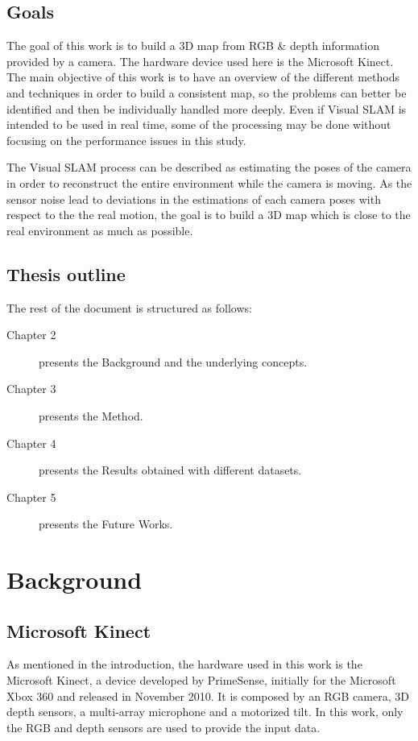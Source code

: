 \documentclass[a4paper,11pt]{kth-mag}
\begin{document}
\section{Goals}

The goal of this work is to build a 3D map from RGB \& depth information provided by a camera. The hardware device used here is the Microsoft Kinect. The main objective of this work is to have an overview of the different methods and techniques in order to build a consistent map, so the problems can better be identified and then be individually handled more deeply. Even if Visual SLAM is intended to be used in real time, some of the processing may be done without focusing on the performance issues in this study. 

The Visual SLAM process can be described as estimating the poses of the camera in order to reconstruct the entire environment while the camera is moving. As the sensor noise lead to deviations in the estimations of each camera poses with respect to the the real motion, the goal is to build a 3D map which is close to the real environment as much as possible.

\section{Thesis outline}
The rest of the document is structured as follows:
\begin{description}
\item[Chapter 2] presents the Background and the underlying concepts.
\item[Chapter 3] presents the Method.
\item[Chapter 4] presents the Results obtained with different datasets.
\item[Chapter 5] presents the Future Works.
\end{description}

\chapter{Background}

\section{Microsoft Kinect}

As mentioned in the introduction, the hardware used in this work is the Microsoft Kinect, a device developed by PrimeSense, initially for the Microsoft Xbox 360 and released in November 2010. It is composed by an RGB camera, 3D depth sensors, a multi-array microphone and a motorized tilt. In this work, only the RGB and depth sensors are used to provide the input data.
\end{document}
